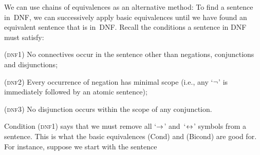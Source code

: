 We can use chains of equivalences as an alternative method: To find a sentence in~DNF, we can successively apply basic equivalences until we have found an equivalent sentence that is in~DNF. Recall the conditions a sentence in DNF must satisfy:
\begin{compactlist}
	\item[(\textsc{dnf1})] No connectives occur in the sentence other than negations, conjunctions and disjunctions;
	\item[(\textsc{dnf2})] Every occurrence of negation has minimal scope (i.e., any `$\neg$' is immediately followed by an atomic sentence);
	\item[(\textsc{dnf3})] No disjunction occurs within the scope of any conjunction.
\end{compactlist}
Condition (\textsc{dnf1}) says that we must remove all `$\rightarrow$' and~`$\leftrightarrow$' symbols from a sentence.  This is what the basic equivalences (Cond) and (Bicond) are good for.  For instance, suppose we start with the sentence

